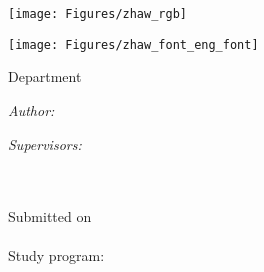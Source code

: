 

\begin{titlepage}

\setlength{\parskip}{0pt}

\begin{center}
\texttt{[image: Figures/zhaw\_rgb]}

\ifxetex
    \vspace{0.6cm}
    {\zhawtitlefont\color{zhawblue}\LARGE \univname\par}   %
    \vspace{0.2cm}
\else
    \vspace{0.87cm}
    {\texttt{[image: Figures/zhaw\_font\_eng\_font]}\par}
    \vspace{0.05cm}
\fi
{\Large Department \deptname\par}                      %
\vspace{0.2cm}
{\Large \instname\par}                                 %
\vspace{3.5cm}                            
\textsc{\Large \ttype}                                 %
\vspace{0.2cm}
\HRule 
\vspace{0.4cm}
{\huge \bfseries \ttitle\par}                          %
\vspace{0.4cm}  
\HRule
\vspace{1.5cm}

 
\begin{minipage}[t]{0.4\textwidth}
\begin{flushleft} 
    \large
    \emph{Author:}\\
    \authorname
\end{flushleft}
\end{minipage}
\begin{minipage}[t]{0.4\textwidth}
\begin{flushright} 
    \large
    \emph{Supervisors:} \\
    \supnameA \\
    \supnameB\\
    \supnameC
\end{flushright}
\end{minipage}
\vspace{2cm}
 
\vfill

{\large
Submitted on\\
\tdate\\
\vspace{1.5cm}
Study program:\\
\studyprog\\
}
\vfill
\end{center}
\end{titlepage}
\restoregeometry
